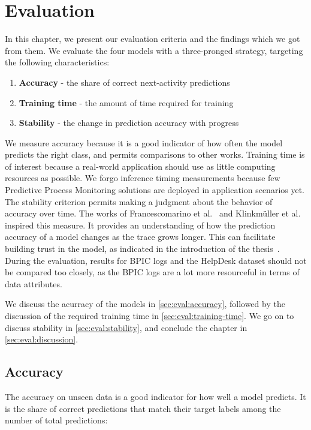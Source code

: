 \chapter{Evaluation}\label{chap:evaluation}
In this chapter, we present our evaluation criteria and the findings which we got from them.
We evaluate the four models with a three-pronged strategy, targeting the following characteristics:

\begin{enumerate}
    \item\textbf{Accuracy} - the share of correct next-activity predictions
    \item\textbf{Training time} - the amount of time required for training
    \item\textbf{Stability} - the change in prediction accuracy with progress
\end{enumerate}

We measure accuracy because it is a good indicator of how often the model predicts the right class, and permits comparisons to other works.
Training time is of interest because a real-world application should use as little computing resources as possible.
We forgo inference timing measurements because few Predictive Process Monitoring solutions are deployed in application scenarios yet.
The stability criterion permits making a judgment about the behavior of accuracy over time. The works of Francescomarino et al.~\cite{francescomarino2015} and Klinkmüller et al.~\cite{klinkmuller2018reliablemonitoring} inspired this measure. It provides an understanding of how the prediction accuracy of a model changes as the trace grows longer. This can facilitate building trust in the model, as indicated in the introduction of the thesis~\cite{klinkmuller2018reliablemonitoring, boehmer2018probability}.
During the evaluation, results for BPIC logs and the HelpDesk dataset should not be compared too closely, as the BPIC logs are a lot more resourceful in terms of data attributes.

We discuss the acurracy of the models in \autoref{sec:eval:accuracy}, followed by the discussion of the required training time in \autoref{sec:eval:training-time}. We go on to discuss stability in \autoref{sec:eval:stability}, and conclude the chapter in \autoref{sec:eval:discussion}.

\section{Accuracy}\label{sec:eval:accuracy}
The accuracy on unseen data is a good indicator for how well a model predicts.
It is the share of correct predictions that match their target labels among the number of total predictions:

